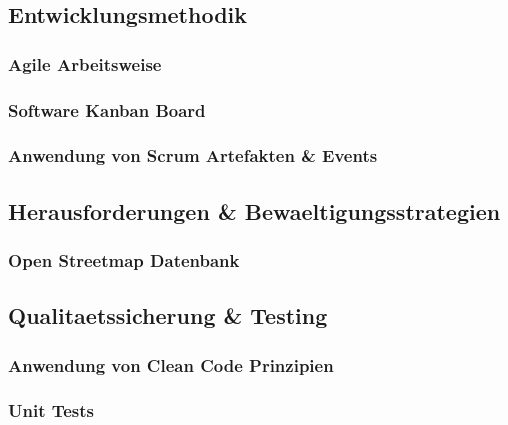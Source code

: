 \documentclass[../main.tex]{subfiles}
\begin{document}
\subsection{Entwicklungsmethodik} %
\subsubsection{Agile Arbeitsweise}
\subsubsection{Software Kanban Board}
\subsubsection{Anwendung von Scrum Artefakten \& Events}

\subsection{Herausforderungen \& Bewaeltigungsstrategien} %
\subsubsection{Open Streetmap Datenbank}

\subsection{Qualitaetssicherung \& Testing} %
\subsubsection{Anwendung von Clean Code Prinzipien}
\subsubsection{Unit Tests}
\end{document}
